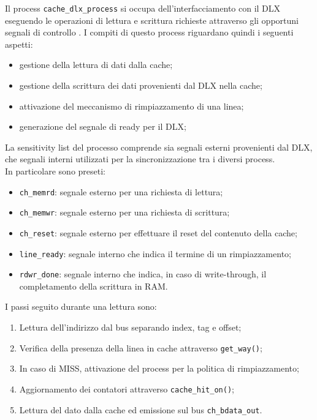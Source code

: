 Il process \texttt{cache\_dlx\_process} si occupa dell'interfacciamento con il DLX eseguendo le operazioni di lettura e scrittura richieste attraverso gli opportuni segnali di controllo .
I compiti di questo process riguardano quindi i seguenti aspetti:
\begin{itemize}
  \item gestione della lettura di dati dalla cache;
  \item gestione della scrittura dei dati provenienti dal DLX nella cache;
  \item attivazione del meccanismo di rimpiazzamento di una linea;
  \item generazione del segnale di ready per il DLX;
\end{itemize}

La sensitivity list del processo comprende sia segnali esterni provenienti dal DLX, che segnali interni utilizzati per la sincronizzazione tra i diversi process.\\
In particolare sono preseti:
\begin{itemize}
  \item \texttt{ch\_memrd}: segnale esterno per una richiesta di lettura;
  \item \texttt{ch\_memwr}: segnale esterno per una richiesta di scrittura;
  \item \texttt{ch\_reset}: segnale esterno per effettuare il reset del contenuto della cache;
  \item \texttt{line\_ready}: segnale interno che indica il termine di un rimpiazzamento;
  \item \texttt{rdwr\_done}: segnale interno che indica, in caso di write-through, il completamento della scrittura in RAM.
\end{itemize}
 
I passi seguito durante una lettura sono:
\begin{enumerate}
  \item Lettura dell'indirizzo dal bus separando index, tag e offset;
  \item Verifica della presenza della linea in cache attraverso \texttt{get\_way()};
  \item In caso di MISS, attivazione del process per la politica di rimpiazzamento;
  \item Aggiornamento dei contatori attraverso \texttt{cache\_hit\_on()};
  \item Lettura del dato dalla cache ed emissione sul bus \texttt{ch\_bdata\_out}.
\end{enumerate}	

